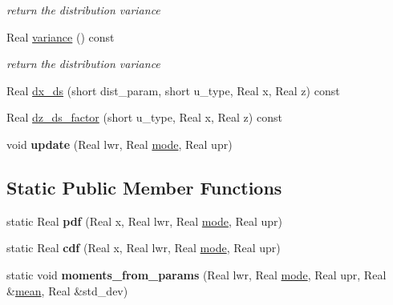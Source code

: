 \begin{DoxyCompactItemize}
\begin{DoxyCompactList}\small\item\em return the distribution variance \end{DoxyCompactList}\item 
Real \hyperlink{classPecos_1_1TriangularRandomVariable_a4b8b05b2a9af92dad9cc304c2925a4eb}{variance} () const \label{classPecos_1_1TriangularRandomVariable_a4b8b05b2a9af92dad9cc304c2925a4eb}

\begin{DoxyCompactList}\small\item\em return the distribution variance \end{DoxyCompactList}\item 
Real \hyperlink{classPecos_1_1TriangularRandomVariable_af889af8adfb262c9b74f573b2a9ffc99}{dx\+\_\+ds} (short dist\+\_\+param, short u\+\_\+type, Real x, Real z) const 
\item 
Real \hyperlink{classPecos_1_1TriangularRandomVariable_af6b5fc528523180bed5fc3008dcea205}{dz\+\_\+ds\+\_\+factor} (short u\+\_\+type, Real x, Real z) const 
\item 
void {\bfseries update} (Real lwr, Real \hyperlink{classPecos_1_1TriangularRandomVariable_a72d3d6926edd929cb3f8e12baa655f70}{mode}, Real upr)\label{classPecos_1_1TriangularRandomVariable_aeba28112b46640c5681ddf9a84af371e}

\end{DoxyCompactItemize}
\subsection*{Static Public Member Functions}
\begin{DoxyCompactItemize}
\item 
static Real {\bfseries pdf} (Real x, Real lwr, Real \hyperlink{classPecos_1_1TriangularRandomVariable_a72d3d6926edd929cb3f8e12baa655f70}{mode}, Real upr)\label{classPecos_1_1TriangularRandomVariable_af17ce86d0f94ded8fe9028f6afa08a06}

\item 
static Real {\bfseries cdf} (Real x, Real lwr, Real \hyperlink{classPecos_1_1TriangularRandomVariable_a72d3d6926edd929cb3f8e12baa655f70}{mode}, Real upr)\label{classPecos_1_1TriangularRandomVariable_ad3b5beb500985f585448e8ac15476c22}

\item 
static void {\bfseries moments\+\_\+from\+\_\+params} (Real lwr, Real \hyperlink{classPecos_1_1TriangularRandomVariable_a72d3d6926edd929cb3f8e12baa655f70}{mode}, Real upr, Real \&\hyperlink{classPecos_1_1TriangularRandomVariable_a962ffe5a3593be370d5c883365c060f4}{mean}, Real \&std\+\_\+dev)\label{classPecos_1_1TriangularRandomVariable_ad799417595a5a14bc6b9c6d4976212f7}

\end{DoxyCompactItemize}

